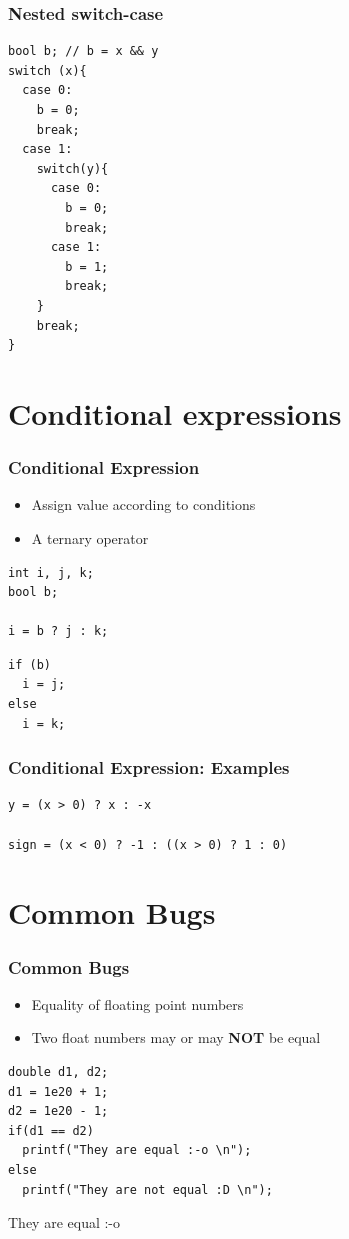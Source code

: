 \documentclass{../c-lecture}
\begin{document}
\begin{frame}[fragile]
  \frametitle{Nested switch-case}
  \begin{verbatim}
bool b; // b = x && y
switch (x){
  case 0:
    b = 0;
    break;
  case 1:
    switch(y){
      case 0:
        b = 0;
        break;
      case 1:
        b = 1;
        break;
    }
    break;
}
  \end{verbatim}
\end{frame}

\section{Conditional expressions}

\begin{frame}[fragile]
  \frametitle{Conditional Expression}
  \begin{itemize}
    \item Assign value according to conditions
    \item A ternary operator
  \end{itemize}
  \begin{verbatim}
int i, j, k;
bool b;

i = b ? j : k;
  \end{verbatim}
  \begin{verbatim}
if (b)
  i = j;
else
  i = k;
  \end{verbatim}
\end{frame}

\begin{frame}[fragile]
  \frametitle{Conditional Expression: Examples}
  \begin{verbatim}
y = (x > 0) ? x : -x

sign = (x < 0) ? -1 : ((x > 0) ? 1 : 0)
  \end{verbatim}
\end{frame}

\section{Common Bugs}

\begin{frame}[fragile]
  \frametitle{Common Bugs}
  \begin{itemize}
    \item Equality of floating point numbers
    \item
      Two float numbers may or may \textbf{\color{RubineRed} NOT} be equal
  \end{itemize}
  \begin{verbatim}
double d1, d2;
d1 = 1e20 + 1;
d2 = 1e20 - 1;
if(d1 == d2)
  printf("They are equal :-o \n");
else
  printf("They are not equal :D \n");
  \end{verbatim}
  \begin{block}{}
  They are equal :-o
  \end{block}
\end{frame}
\end{document}

